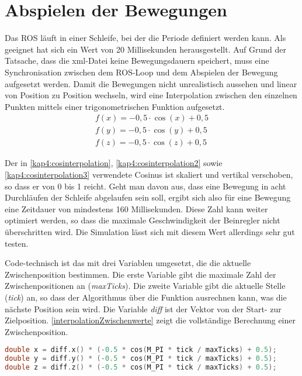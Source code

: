 

\section{Abspielen der Bewegungen}

Das \ac{ROS} läuft in einer Schleife, bei der die Periode definiert werden kann. Als geeignet hat sich ein Wert von 20 Millisekunden herausgestellt. Auf Grund der Tatsache, dass die xml-Datei keine Bewegungsdauern speichert, muss eine Synchronisation zwischen dem \ac{ROS}-Loop und dem Abspielen der Bewegung aufgesetzt werden. Damit die Bewegungen nicht unrealistisch aussehen und linear von Position zu Position wechseln, wird eine Interpolation zwischen den einzelnen Punkten mittels einer trigonometrischen Funktion aufgesetzt.
\begin{eqnarray}
\label{kap4:cosinterpolation}
f(x) = -0,5 \cdot \cos{(x)} + 0{,}5 \\
\label{kap4:cosinterpolation2}
f(y) = -0,5 \cdot \cos{(y)} + 0{,}5 \\
\label{kap4:cosinterpolation3}
f(z) = -0,5 \cdot \cos{(z)} + 0{,}5
\end{eqnarray}

Der in \autoref{kap4:cosinterpolation}, \ref{kap4:cosinterpolation2} sowie \ref{kap4:cosinterpolation3} verwendete Cosinus ist skaliert und vertikal verschoben, so dass er von 0 bis 1 reicht. Geht man davon aus, dass eine Bewegung in acht Durchläufen der Schleife abgelaufen sein soll, ergibt sich also für eine Bewegung eine Zeitdauer von mindestens 160 Millisekunden. Diese Zahl kann weiter optimiert werden, so dass die maximale Geschwindigkeit der Beinregler nicht überschritten wird. Die Simulation lässt sich mit diesem Wert allerdings sehr gut testen.

Code-technisch ist das mit drei Variablen umgesetzt, die die aktuelle Zwischenposition bestimmen. Die erste Variable gibt die maximale Zahl der Zwischenpositionen an (\emph{maxTicks}). Die zweite Variable gibt die aktuelle Stelle (\emph{tick}) an, so dass der Algorithmus über die Funktion ausrechnen kann, was die nächste Position sein wird. Die Variable \emph{diff} ist der Vektor von der Start- zur Zielposition. \autoref{interpolationZwischenwerte} zeigt die vollständige Berechnung einer Zwischenposition.

\begin{lstlisting}[label={interpolationZwischenwerte}, language=C++, caption={Interpolation der Zwischenpositionen}]
double x = diff.x() * (-0.5 * cos(M_PI * tick / maxTicks) + 0.5);
double y = diff.y() * (-0.5 * cos(M_PI * tick / maxTicks) + 0.5);
double z = diff.z() * (-0.5 * cos(M_PI * tick / maxTicks) + 0.5);
\end{lstlisting}

